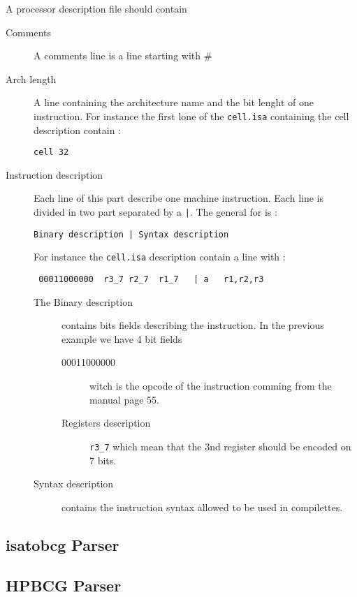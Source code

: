 \documentclass{article}
\begin{document}
A processor description file should contain
\begin{description}
\item[Comments] A comments line is a line starting with \#
\item[Arch length] A line containing the architecture name and the bit
  lenght of one instruction. For instance the first lone of the 
\verb|cell.isa| containing the cell description contain :
\begin{verbatim}
cell 32
\end{verbatim}
\item[Instruction description] Each line of this part describe one
  machine instruction. Each line is divided in two part separated by a
  \verb-|-. The general for is :

\begin{verbatim}
Binary description | Syntax description
\end{verbatim}

For instance the \verb|cell.isa| description contain a line with :
\begin{verbatim}
 00011000000  r3_7 r2_7  r1_7   | a   r1,r2,r3
\end{verbatim}
  \begin{description}
  \item[The Binary description] contains bits fields describing the
    instruction. In the previous example we have 4 bit fields
    \begin{description}
      \item[00011000000] witch is the opcode of the instruction
        comming from the manual\cite{SPU1} page 55.
      \item[Registers description] \verb|r3_7| which mean that the 3nd
        register should be encoded on 7 bits.
    \end{description}
  \item[Syntax description] contains the instruction syntax allowed to
    be used in compilettes.
  \end{description}

\end{description}

\subsection{isatobcg Parser}


\subsection{HPBCG Parser}
\end{document}
